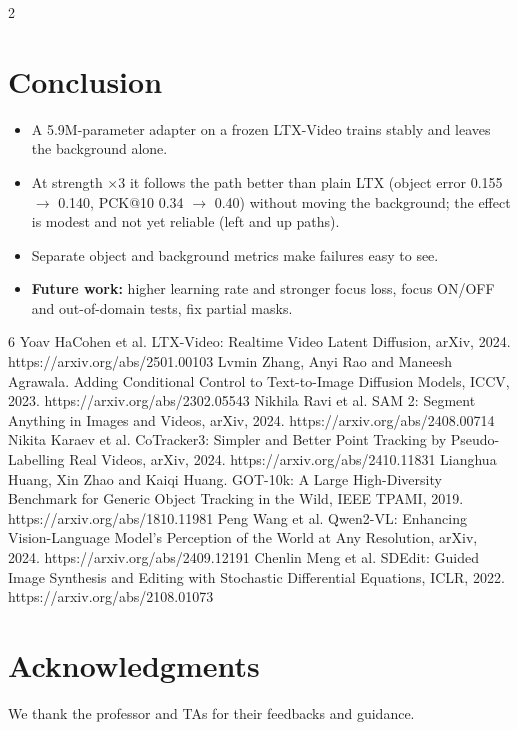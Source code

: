 \documentclass[a0,portrait]{a0poster}
\begin{document}
\begin{minipage}[c]{\linewidth}
\begin{framed}
\begin{multicols}{2}
\section*{Conclusion}
\begin{itemize}
    \item A 5.9M-parameter adapter on a frozen LTX-Video trains stably and leaves the background alone.
    \item At strength $\times$3 it follows the path better than plain LTX (object error 0.155 $\rightarrow$ 0.140, PCK@10 0.34 $\rightarrow$ 0.40) without moving the background; the effect is modest and not yet reliable (left and up paths).
    \item Separate object and background metrics make failures easy to see.
    \item \textbf{Future work:} higher learning rate and stronger focus loss, focus ON/OFF and out-of-domain tests, fix partial masks.
\end{itemize}

\begin{thebibliography}{6}
\small
{} Yoav HaCohen et al. LTX-Video: Realtime Video Latent Diffusion, arXiv, 2024. https://arxiv.org/abs/2501.00103
 Lvmin Zhang, Anyi Rao and Maneesh Agrawala. Adding Conditional Control to Text-to-Image Diffusion Models, ICCV, 2023. https://arxiv.org/abs/2302.05543
 Nikhila Ravi et al. SAM 2: Segment Anything in Images and Videos, arXiv, 2024. https://arxiv.org/abs/2408.00714
 Nikita Karaev et al. CoTracker3: Simpler and Better Point Tracking by Pseudo-Labelling Real Videos, arXiv, 2024. https://arxiv.org/abs/2410.11831
 Lianghua Huang, Xin Zhao and Kaiqi Huang. GOT-10k: A Large High-Diversity Benchmark for Generic Object Tracking in the Wild, IEEE TPAMI, 2019. https://arxiv.org/abs/1810.11981
 Peng Wang et al. Qwen2-VL: Enhancing Vision-Language Model's Perception of the World at Any Resolution, arXiv, 2024. https://arxiv.org/abs/2409.12191
 Chenlin Meng et al. SDEdit: Guided Image Synthesis and Editing with Stochastic Differential Equations, ICLR, 2022. https://arxiv.org/abs/2108.01073
\end{thebibliography}

\section*{Acknowledgments}
\small \textnormal{We thank the professor and TAs for their feedbacks and guidance.}


\end{multicols}
\end{framed}
\end{minipage}
\end{document}
